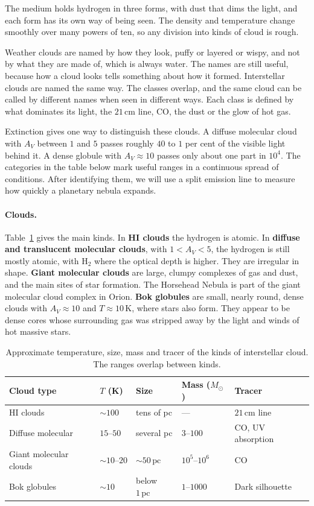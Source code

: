 The medium holds hydrogen in three forms, with dust that dims the light, and each form has its own way of being seen. The density and temperature change smoothly over many powers of ten, so any division into kinds of cloud is rough.

Weather clouds are named by how they look, puffy or layered or wispy, and not by what they are made of, which is always water. The names are still useful, because how a cloud looks tells something about how it formed. Interstellar clouds are named the same way. The classes overlap, and the same cloud can be called by different names when seen in different ways. Each class is defined by what dominates its light, the $21\,\mathrm{cm}$ line, CO, the dust or the glow of hot gas.

Extinction gives one way to distinguish these clouds. A diffuse molecular cloud with $A_V$ between $1$ and $5$ passes roughly $40$ to $1$ per cent of the visible light behind it. A dense globule with $A_V\approx10$ passes only about one part in $10^4$. The categories in the table below mark useful ranges in a continuous spread of conditions. After identifying them, we will use a split emission line to measure how quickly a planetary nebula expands.

\paragraph{Clouds.} Table~\ref{tab:ism_cloud_types} gives the main kinds. In \textbf{HI clouds} the hydrogen is atomic. In \textbf{diffuse and translucent molecular clouds}, with $1<A_V<5$, the hydrogen is still mostly atomic, with $\mathrm{H_2}$ where the optical depth is higher. They are irregular in shape. \textbf{Giant molecular clouds} are large, clumpy complexes of gas and dust, and the main sites of star formation. The Horsehead Nebula is part of the giant molecular cloud complex in Orion. \textbf{Bok globules} are small, nearly round, dense clouds with $A_V\approx10$ and $T\approx10\,\mathrm K$, where stars also form. They appear to be dense cores whose surrounding gas was stripped away by the light and winds of hot massive stars.

\begin{table}[htbp]
	\centering
	\small
	\begin{tabular}{@{}l l l l l@{}}
		\toprule
		\textbf{Cloud type} & \textbf{$T$ (K)} & \textbf{Size} & \textbf{Mass ($M_\odot$)} & \textbf{Tracer} \\
		\midrule
		HI clouds & $\sim 100$ & tens of pc & --- & $21\,\mathrm{cm}$ line \\
		Diffuse molecular & $15\text{--}50$ & several pc & $3\text{--}100$ & CO, UV absorption \\
		Giant molecular clouds & $\sim 10\text{--}20$ & $\sim 50\,\mathrm{pc}$ & $10^5\text{--}10^6$ & CO \\
		Bok globules & $\sim 10$ & below $1\,\mathrm{pc}$ & $1\text{--}1000$ & Dark silhouette \\
		\bottomrule
	\end{tabular}
	\caption{Approximate temperature, size, mass and tracer of the kinds of interstellar cloud. The ranges overlap between kinds.}
	\label{tab:ism_cloud_types}
\end{table}

